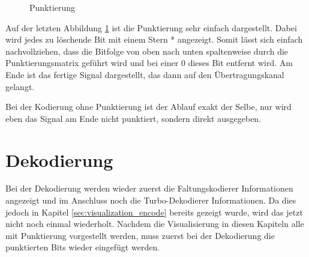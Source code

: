 \begin{figure}[!ht]
\centering
{}
\caption{Punktierung}
\label{pic:TurboEncodePuncturing}
\end{figure}  

Auf der letzten Abbildung \ref{pic:TurboEncodePuncturing} ist die Punktierung sehr einfach dargestellt. Dabei wird jedes zu löschende Bit mit einem Stern * angezeigt. Somit lässt sich einfach nachvollziehen, dass die Bitfolge von oben nach unten spaltenweise durch die Punktierungsmatrix geführt wird und bei einer 0 dieses Bit entfernt wird. Am Ende ist das fertige Signal dargestellt, das dann auf den Übertragungskanal gelangt. 

Bei der Kodierung ohne Punktierung ist der Ablauf exakt der Selbe, nur wird eben das Signal am Ende nicht punktiert, sondern direkt ausgegeben.

\section{Dekodierung}
\label{sec:visualization_decode}
Bei der Dekodierung werden wieder zuerst die Faltungskodierer Informationen angezeigt und im Anschluss noch die Turbo-Dekodierer Informationen. Da dies jedoch in Kapitel \ref{sec:visualization_encode} bereits gezeigt wurde, wird das jetzt nicht noch einmal wiederholt. Nachdem die Visualisierung in diesen Kapiteln alle mit Punktierung vorgestellt werden, muss zuerst bei der Dekodierung die punktierten Bits wieder eingefügt werden.

